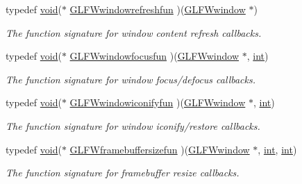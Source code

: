 \begin{DoxyCompactItemize}
typedef \hyperlink{wglew_8h_aeea6e3dfae3acf232096f57d2d57f084}{void}($\ast$ \hyperlink{group__window_ga16764f89bf2060e6fa477f0943e1412b}{G\-L\-F\-Wwindowrefreshfun} )(\hyperlink{group__window_ga3c96d80d363e67d13a41b5d1821f3242}{G\-L\-F\-Wwindow} $\ast$)
\begin{DoxyCompactList}\small\item\em The function signature for window content refresh callbacks. \end{DoxyCompactList}\item 
typedef \hyperlink{wglew_8h_aeea6e3dfae3acf232096f57d2d57f084}{void}($\ast$ \hyperlink{group__window_ga6b5f973531ea91663ad707ba4f2ac104}{G\-L\-F\-Wwindowfocusfun} )(\hyperlink{group__window_ga3c96d80d363e67d13a41b5d1821f3242}{G\-L\-F\-Wwindow} $\ast$, \hyperlink{wglew_8h_a500a82aecba06f4550f6849b8099ca21}{int})
\begin{DoxyCompactList}\small\item\em The function signature for window focus/defocus callbacks. \end{DoxyCompactList}\item 
typedef \hyperlink{wglew_8h_aeea6e3dfae3acf232096f57d2d57f084}{void}($\ast$ \hyperlink{group__window_gae47ae066eea9fe6050a62360928ae524}{G\-L\-F\-Wwindowiconifyfun} )(\hyperlink{group__window_ga3c96d80d363e67d13a41b5d1821f3242}{G\-L\-F\-Wwindow} $\ast$, \hyperlink{wglew_8h_a500a82aecba06f4550f6849b8099ca21}{int})
\begin{DoxyCompactList}\small\item\em The function signature for window iconify/restore callbacks. \end{DoxyCompactList}\item 
typedef \hyperlink{wglew_8h_aeea6e3dfae3acf232096f57d2d57f084}{void}($\ast$ \hyperlink{group__window_ga311bb32e578aa240b6464af494debffc}{G\-L\-F\-Wframebuffersizefun} )(\hyperlink{group__window_ga3c96d80d363e67d13a41b5d1821f3242}{G\-L\-F\-Wwindow} $\ast$, \hyperlink{wglew_8h_a500a82aecba06f4550f6849b8099ca21}{int}, \hyperlink{wglew_8h_a500a82aecba06f4550f6849b8099ca21}{int})
\begin{DoxyCompactList}\small\item\em The function signature for framebuffer resize callbacks. \end{DoxyCompactList}\end{DoxyCompactItemize}

